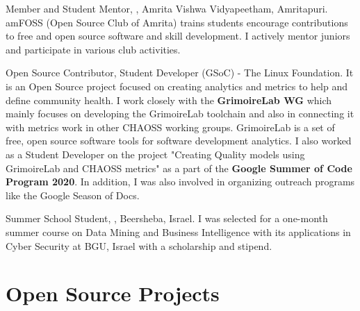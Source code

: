 \documentclass[11pt,a4paper,sans]{moderncv} %
\begin{document}
{
    Member and Student Mentor, \textbf{}, Amrita Vishwa Vidyapeetham, Amritapuri.
    \newline
    amFOSS (Open Source Club of Amrita) trains students encourage contributions to free and open source software and skill development. I actively mentor juniors and participate in various club activities.
}

{
    Open Source Contributor, Student Developer (GSoC) \textbf{} - The Linux Foundation.
    \newline
    It is an Open Source project focused on creating analytics and metrics to help and define community health. I work closely with the \textbf{GrimoireLab WG} which mainly focuses on developing the GrimoireLab toolchain and also in connecting it with metrics work in other CHAOSS working groups. GrimoireLab is a set of free, open source software tools for software development analytics.
    \newline
    I also worked as a Student Developer on the project "Creating Quality models using GrimoireLab and CHAOSS metrics" as a part of the \textbf{Google Summer of Code Program 2020}. In addition, I was also involved in organizing outreach programs like the Google Season of Docs.
}

{
    Summer School Student, \textbf{}, Beersheba, Israel.
    \newline
    I was selected for a one-month summer course on Data Mining and Business Intelligence with its applications in Cyber Security at BGU, Israel with a scholarship and stipend.
}




\section{Open Source Projects}

\end{document}
